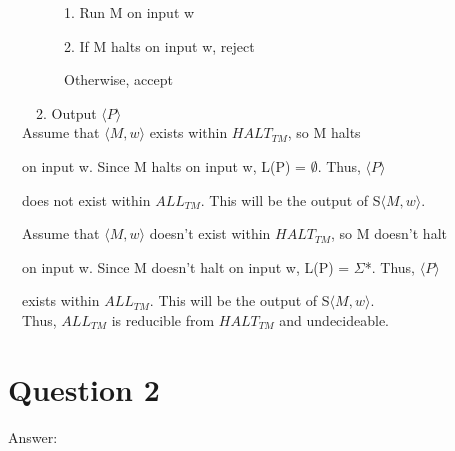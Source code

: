 \documentclass[12pt]{article}
\begin{document}
$\quad\quad\quad\quad$1. Run M on input w

$\quad\quad\quad\quad$2. If M halts on input w, reject

$\quad\quad\quad\quad$Otherwise, accept

$\quad\quad$2. Output $\langle P\rangle$\\[.04in]

$\quad$Assume that $\langle M, w\rangle$ exists within $HALT_{TM}$, so M halts

$\quad$on input w. Since M halts on input w, L(P) = $\emptyset$. Thus, $\langle P\rangle$

$\quad$does not exist within $ALL_{TM}$. This will be the output of S$\langle M, w\rangle$.

$\quad$Assume that $\langle M, w\rangle$ doesn't exist within $HALT_{TM}$, so M doesn't halt

$\quad$on input w. Since M doesn't halt on input w, L(P) = $\Sigma$*. Thus, $\langle P\rangle$

$\quad$exists within $ALL_{TM}$. This will be the output of S$\langle M, w\rangle$.\\[.04in]

$\quad$Thus, $ALL_{TM}$ is reducible from $HALT_{TM}$ and undecideable.







\section{Question 2}
Answer:
\end{document}
